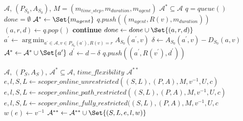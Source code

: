 \documentclass{article}
\DeclareMathOperator*{\argmin}{arg\,min}
\begin{document}
\begin{algorithm}
	\caption{$changed\_transmission\_chains$} \label{algo:transmission_chains}
	\begin{algorithmic}[1]
		\Require $\mathcal{A}$, $(P_{S_0},A_{S_0})$, $M=(m_{time\_step},m_{duration},m_{agent})$
	    \Ensure $\mathcal{A}^* \subseteq \mathcal{A}$
	    \State $q = queue()$
	    \State $done = \emptyset$
	    \State $\mathcal{A}^* \leftarrow \Set{m_{agent}}$
	        \State $q.push((m_{agent},R(v),m_{duration}))$
	    \EndFor
            \State $(a,r,d) \leftarrow q.pop()$
                \State \textbf{continue}
            \EndIf
            \State $done \leftarrow done \cup \Set{(a,r,d)}$
            \State $a^\prime \leftarrow \argmin_{a^\prime \in \mathcal{A}, v \in P_{S_0}(a^\prime), R(v)=r} A_{S_0}(a^\prime,v)$
            \State $\delta \leftarrow A_{S_0}(a^\prime,v) - D_{S_0}(a,v)$
                \State $\mathcal{A}^* \leftarrow \mathcal{A}^* \cup \Set{a^\prime}$
                \State $d^\prime \leftarrow d-\delta$
    	            \State $q.push((a^\prime,R(v^\prime),d^\prime))$
    	        \EndFor
            \EndIf{}

	    \EndWhile

	\end{algorithmic}
\end{algorithm}





\begin{algorithm}
	\caption{$scoper\_changed$} \label{algo:scoper_changed}
	\begin{algorithmic}[1]
		\Require $\mathcal{A}$, $(P_S,A_S)$, $\mathcal{A}^*\subseteq\mathcal{A}$, $time\_flexibility$
	    \Ensure $\mathcal{A}^{**}$
    	        \State $e,l,S,L \leftarrow scoper\_online\_unrestricted((S,L), (P,A), M, v^{-1}, U, c)$
    	        \State $e,l,S,L \leftarrow scoper\_online\_path\_restricted((S,L), (P,A), M, v^{-1}, U, c)$
    	    \Else
    	        \State $e,l,S,L \leftarrow scoper\_online\_fully\_restricted((S,L), (P,A), M, v^{-1}, U, c$
    	    \EndIf
    	        \State $w(e) \leftarrow v^{-1}$
    	    \EndFor
    	    \State $\mathcal{A}^{**} \leftarrow \mathcal{A}^{**} \cup \Set{(S,L,e,l,w)}$
	    \EndFor
	\end{algorithmic}
\end{algorithm}
\end{document}
